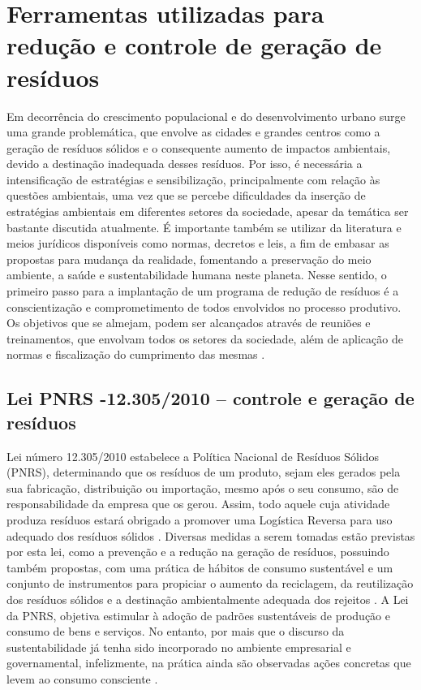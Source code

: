 \documentclass[
	12pt,				%
	openany,			%
	twoside,			%
	a4paper,			%
	english,			%
	french,				%
	spanish,			%
	brazil				%
	]{abntex2}
\begin{document}
\section{Ferramentas utilizadas para redução e controle de geração de resíduos}
Em decorrência do crescimento populacional e do desenvolvimento urbano surge uma grande problemática, que envolve as cidades e grandes centros como a geração de resíduos sólidos e o consequente aumento de impactos ambientais, devido a destinação inadequada desses resíduos. 
Por isso, é necessária a intensificação de estratégias e sensibilização, principalmente com relação às questões ambientais, uma vez que se percebe dificuldades da inserção de estratégias ambientais em diferentes setores da sociedade, apesar da temática ser bastante discutida atualmente. É importante também se utilizar da literatura e meios jurídicos disponíveis como normas, decretos e leis, a fim de embasar as propostas para mudança da realidade, fomentando a preservação do meio ambiente, a saúde e sustentabilidade humana neste planeta.
Nesse sentido, o primeiro passo para a implantação de um programa de redução de resíduos é a conscientização e comprometimento de todos envolvidos no processo produtivo. Os objetivos que se almejam, podem ser alcançados através de reuniões e treinamentos, que envolvam todos os setores da sociedade, além de aplicação de normas e fiscalização do cumprimento das mesmas \cite{rsgsieskvs}.

\subsection{Lei PNRS -12.305/2010 – controle e geração de resíduos}

 Lei número 12.305/2010 estabelece a Política Nacional de Resíduos Sólidos (PNRS), determinando que os resíduos de um produto, sejam eles gerados pela sua fabricação, distribuição ou importação, mesmo após o seu consumo, são de responsabilidade da empresa que os gerou. Assim, todo aquele cuja atividade produza resíduos estará obrigado a promover uma Logística Reversa para uso adequado dos resíduos sólidos \cite{assg}.
Diversas medidas a serem tomadas estão previstas por esta lei, como a prevenção e a redução na geração de resíduos, possuindo também propostas, com uma prática de hábitos de consumo sustentável e um conjunto de instrumentos para propiciar o aumento da reciclagem, da reutilização dos resíduos sólidos e a destinação ambientalmente adequada dos rejeitos \cite{ifea}.
A Lei da PNRS, objetiva estimular à adoção de padrões sustentáveis de produção e consumo de bens e serviços. No entanto, por mais que o discurso da sustentabilidade já tenha sido incorporado no ambiente empresarial e governamental, infelizmente, na prática ainda são observadas ações concretas que levem ao consumo consciente \cite{sme}.
\end{document}
